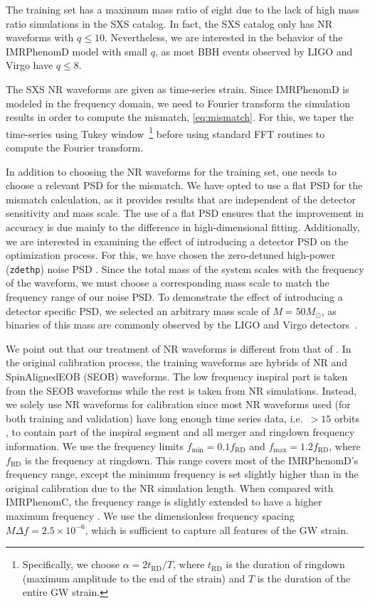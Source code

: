 \documentclass[twocolumn]{aastex631}
\newcommand{\zdethp}{\texttt{zdethp}}
\newcommand{\te}[1]{{\color{rr}[TE: #1 ]}}
\begin{document}
The training set has a maximum mass ratio of eight due to the lack 
of high mass ratio simulations in the SXS catalog.
In fact, the SXS catalog only has NR waveforms with $q\leq10$.
Nevertheless, we are interested in the behavior of the IMRPhenomD model with small $q$,
as most BBH events observed by LIGO and Virgo have $q\leq8$.

The SXS NR waveforms are given as time-series strain.
Since IMRPhenomD is modeled in the frequency domain, we need to Fourier transform the simulation results
in order to compute the mismatch, \eqref{eq:mismatch}.
For this, we taper the time-series using Tukey window~\citep{usman2016pycbc}\footnote{
	Specifically, we choose $\alpha=2t_{\mathrm{RD}}/T$, where
	$t_{\mathrm{RD}}$ is the duration of ringdown (maximum amplitude to the end of the strain) and $T$ is the duration of the
	entire GW strain. 
} before using standard FFT routines to compute the Fourier transform.

In addition to choosing the NR waveforms for the training set,
one needs to choose a relevant PSD for the mismatch.
We have opted to use a flat PSD for the mismatch calculation,
as it provides results that are independent of the detector sensitivity and mass scale.
The use of a flat PSD ensures that the improvement in accuracy is due mainly
to the difference in high-dimensional fitting.
Additionally, we are interested in examining the effect of introducing a detector PSD
on the optimization process. For this, we have chosen the
zero-detuned high-power (\zdethp) noise PSD \citep{aasi2015advanced}.
Since the total mass of the system scales with the frequency of the waveform,
we must choose a corresponding mass scale to match the frequency range of our noise PSD.
To demonstrate the effect of introducing a detector specific PSD,
we selected an arbitrary mass scale of $M=50M_{\odot}$, as binaries
of this mass are commonly observed by the LIGO and Virgo detectors~\citep{gwtc1, gwtc2, gwtc21, gwtc3}.

We point out that our treatment of NR waveforms is different from that of \citep{husa2016frequency, khan2016frequency}.
In the original calibration process, the training waveforms are hybrids of NR and SpinAlignedEOB (SEOB) waveforms.
The low frequency inspiral part is taken from the SEOB
waveforms while the rest is taken from NR simulations.
Instead, we solely use NR waveforms for calibration since most NR waveforms used (for both training and validation)
have long enough time series data, i.e.~$>15$ orbits \citep{boyle2019sxs}, to contain part of the inspiral segment and all
merger and ringdown frequency information. We use the frequency limits
$f_{\mathrm{min}}=0.1f_{\mathrm{RD}}$ and $f_{\mathrm{max}}=1.2f_{\mathrm{RD}}$,	
where $f_{\mathrm{RD}}$ is the frequency at ringdown. This range covers most of
the IMRPhenomD's frequency range, except the minimum frequency is set slightly higher
than in the original calibration due to the NR simulation length.
When compared with IMRPhenomC, the frequency range is slightly extended to have a higher maximum
frequency \citep{santamaria2010matching}.
We use the dimensionless frequency spacing $M\Delta f=2.5\times10^{-6}$, 
which is sufficient to capture all features of the GW strain. 
\end{document}
